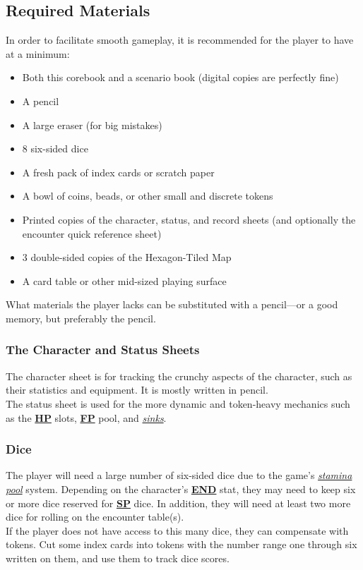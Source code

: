 \documentclass[12pt]{article}
\newcommand{\refto}[1]{\hyperlink{#1}{\textbf{#1}}}
\newcommand{\reftoit}[1]{\hyperlink{#1}{\emph{#1}}}
\begin{document}
\begin{multicols*}{2}
\subsection{Required Materials}
In order to facilitate smooth gameplay, it is recommended for the player to have at a minimum:
\begin{itemize}
\item Both this corebook and a scenario book (digital copies are perfectly fine)
\item A pencil
\item A large eraser (for big mistakes)
\item 8 six-sided dice
\item A fresh pack of index cards or scratch paper
\item A bowl of coins, beads, or other small and discrete tokens
\item Printed copies of the character, status, and record sheets (and optionally the encounter quick reference sheet)
\item 3 double-sided copies of the Hexagon-Tiled Map
\item A card table or other mid-sized playing surface
\end{itemize}
What materials the player lacks can be substituted with a pencil—or a good memory, but preferably the pencil.

\subsubsection*{The Character and Status Sheets}
The character sheet is for tracking the crunchy aspects of the character, such as their statistics and equipment. It is mostly written in pencil.\\
The status sheet is used for the more dynamic and token-heavy mechanics such as the \refto{HP} slots, \refto{FP} pool, and \reftoit{sinks}.

\subsubsection*{Dice}
The player will need a large number of six-sided dice due to the game’s \reftoit{stamina pool} system. Depending on the character’s \refto{END} stat, they may need to keep six or more dice reserved for \refto{SP} dice. In addition, they will need at least two more dice for rolling on the encounter table(s).\\
If the player does not have access to this many dice, they can compensate with tokens. Cut some index cards into tokens with the number range one through six written on them, and use them to track dice scores.


\end{multicols*}
\end{document}
